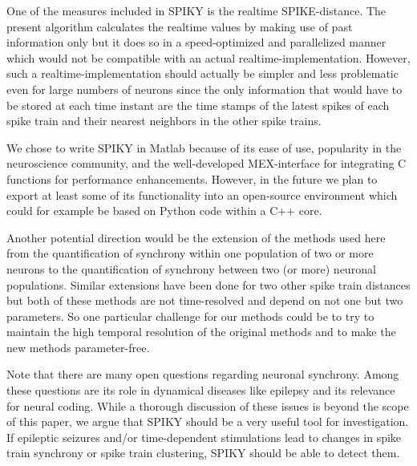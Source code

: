 \documentclass[10pt,twocolumn]{elsart5p}
\begin{document}
One of the measures included in SPIKY is the realtime SPIKE-distance. The present algorithm calculates the realtime values by making use of past information only but it does so in a speed-optimized and parallelized manner which would not be compatible with an actual realtime-implementation. However, such a realtime-implementation should actually be simpler and less problematic even for large numbers of neurons since the only information that would have to be stored at each time instant are the time stamps of the latest spikes of each spike train and their nearest neighbors in the other spike trains.

We chose to write SPIKY in Matlab because of its ease of use, popularity in the neuroscience community, and the well-developed MEX-interface for integrating C functions for performance enhancements. However, in the future we plan to export at least some of its functionality into an open-source environment which could for example be based on Python code within a C++ core.

Another potential direction would be the extension of the methods used here from the quantification of synchrony within one population of two or more neurons to the quantification of synchrony between two (or more) neuronal populations. Similar extensions have been done for two other spike train distances \citep{Aronov03, Houghton08} but both of these methods are not time-resolved and depend on not one but two parameters. So one particular challenge for our methods could be to try to maintain the high temporal resolution of the original methods and to make the new methods parameter-free.

Note that there are many open questions regarding neuronal synchrony. Among these questions are its role in dynamical diseases like epilepsy and its relevance for neural coding. While a thorough discussion of these issues is beyond the scope of this paper, we argue that SPIKY should be a very useful tool for investigation. If epileptic seizures and/or time-dependent stimulations lead to changes in spike train synchrony or spike train clustering, SPIKY should be able to detect them.
\end{document}
